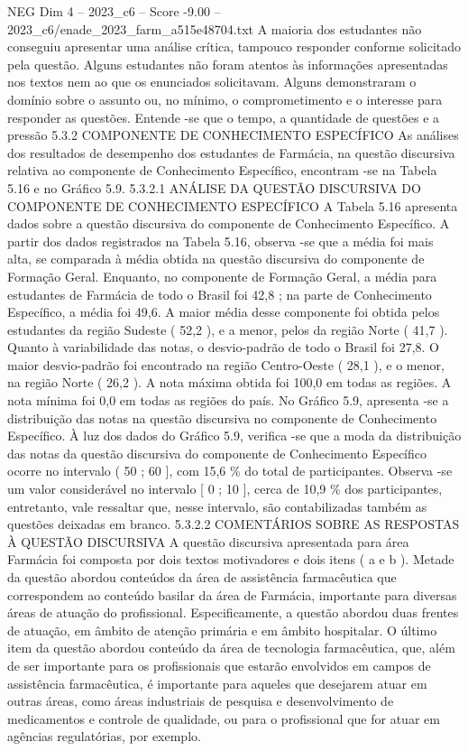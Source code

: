 \begin{textsample}{NEG Dim 4 – 2023\_c6 – Score -9.00 – 2023\_c6/enade\_2023\_farm\_a515e48704.txt}
A maioria dos estudantes não conseguiu apresentar uma análise crítica, tampouco responder conforme solicitado pela questão.
Alguns estudantes não foram atentos às informações apresentadas nos textos nem ao que os enunciados solicitavam.
Alguns demonstraram o domínio sobre o assunto ou, no mínimo, o comprometimento e o interesse para responder as questões.
Entende -se que o tempo, a quantidade de questões e a pressão 5.3.2 COMPONENTE DE CONHECIMENTO ESPECÍFICO As análises dos resultados de desempenho dos estudantes de Farmácia, na questão discursiva relativa ao componente de Conhecimento Específico, encontram -se na Tabela 5.16 e no Gráfico 5.9. 5.3.2.1 ANÁLISE DA QUESTÃO DISCURSIVA DO COMPONENTE DE CONHECIMENTO ESPECÍFICO A Tabela 5.16 apresenta dados sobre a questão discursiva do componente de Conhecimento Específico.
A partir dos dados registrados na Tabela 5.16, observa -se que a média foi mais alta, se comparada à média obtida na questão discursiva do componente de Formação Geral.
Enquanto, no componente de Formação Geral, a média para estudantes de Farmácia de todo o Brasil foi 42,8 ; na parte de Conhecimento Específico, a média foi 49,6.
A maior média desse componente foi obtida pelos estudantes da região Sudeste ( 52,2 ), e a menor, pelos da região Norte ( 41,7 ).
Quanto à variabilidade das notas, o desvio-padrão de todo o Brasil foi 27,8.
O maior desvio-padrão foi encontrado na região Centro-Oeste ( 28,1 ), e o menor, na região Norte ( 26,2 ).
A nota máxima obtida foi 100,0 em todas as regiões.
A nota mínima foi 0,0 em todas as regiões do país.
No Gráfico 5.9, apresenta -se a distribuição das notas na questão discursiva no componente de Conhecimento Específico.
À luz dos dados do Gráfico 5.9, verifica -se que a moda da distribuição das notas da questão discursiva do componente de Conhecimento Específico ocorre no intervalo ( 50 ; 60 ], com 15,6 \% do total de participantes.
Observa -se um valor considerável no intervalo [ 0 ; 10 ], cerca de 10,9 \% dos participantes, entretanto, vale ressaltar que, nesse intervalo, são contabilizadas também as questões deixadas em branco. 5.3.2.2 COMENTÁRIOS SOBRE AS RESPOSTAS À QUESTÃO DISCURSIVA A questão discursiva apresentada para área Farmácia foi composta por dois textos motivadores e dois itens ( a e b ).
Metade da questão abordou conteúdos da área de assistência farmacêutica que correspondem ao conteúdo basilar da área de Farmácia, importante para diversas áreas de atuação do profissional.
Especificamente, a questão abordou duas frentes de atuação, em âmbito de atenção primária e em âmbito hospitalar.
O último item da questão abordou conteúdo da área de tecnologia farmacêutica, que, além de ser importante para os profissionais que estarão envolvidos em campos de assistência farmacêutica, é importante para aqueles que desejarem atuar em outras áreas, como áreas industriais de pesquisa e desenvolvimento de medicamentos e controle de qualidade, ou para o profissional que for atuar em agências regulatórias, por exemplo.

\end{textsample}
